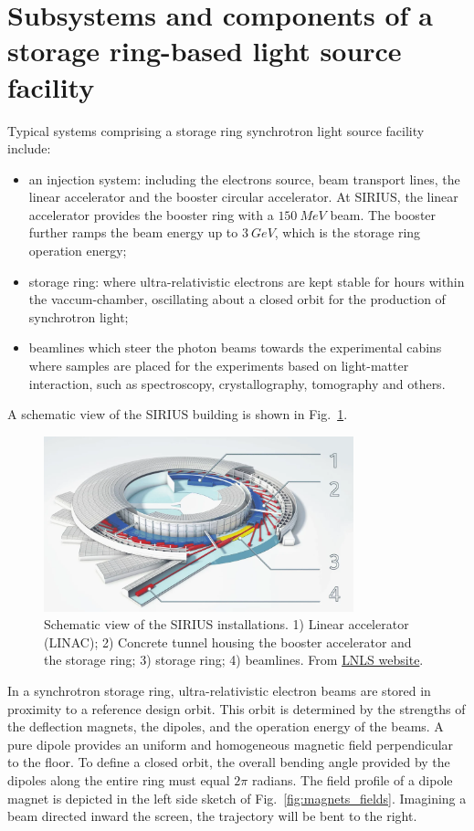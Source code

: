 \section{Subsystems and components of a storage ring-based light source facility}
Typical systems comprising a storage ring synchrotron light source facility include:
\begin{itemize}
    \item an injection system: including the electrons source, beam transport lines, the linear accelerator and the booster circular accelerator. At SIRIUS, the linear accelerator provides the booster ring with a $150~\unit{MeV}$ beam. The booster further ramps the beam energy up to $3~\unit{GeV}$, which is the storage ring operation energy;
    \item storage ring: where ultra-relativistic electrons are kept stable for hours within the vaccum-chamber, oscillating about a closed orbit for the production of synchrotron light;
    \item beamlines which steer the photon beams towards the experimental cabins where samples are placed for the experiments based on light-matter interaction, such as spectroscopy, crystallography, tomography and others.
\end{itemize}
A schematic view of the SIRIUS building is shown in Fig.~\ref{fig:sirius_layout}.
\begin{figure}[t]
    \centering
    \includegraphics[width=0.8\textwidth]{Images/sirius_facility.png}
    \caption{Schematic view of the SIRIUS installations. 1) Linear accelerator (LINAC); 2) Concrete tunnel housing the booster accelerator and the storage ring; 3) storage ring; 4) beamlines. From \href{https://lnls.cnpem.br/sirius/como-funciona-o-sirius/}{LNLS website}.}
    \label{fig:sirius_layout}
\end{figure}


In a synchrotron storage ring, ultra-relativistic electron beams are stored in proximity to a reference design orbit. This orbit is determined by the strengths of the deflection magnets, the dipoles, and the operation energy of the beams. A pure dipole provides an uniform and homogeneous magnetic field perpendicular to the floor. To define a closed orbit, the overall bending angle provided by the dipoles along the entire ring must equal $2\pi$ radians. The field profile of a dipole magnet is depicted in the left side sketch of Fig.~\ref{fig:magnets_fields}. Imagining a beam directed inward the screen, the trajectory will be bent to the right.

